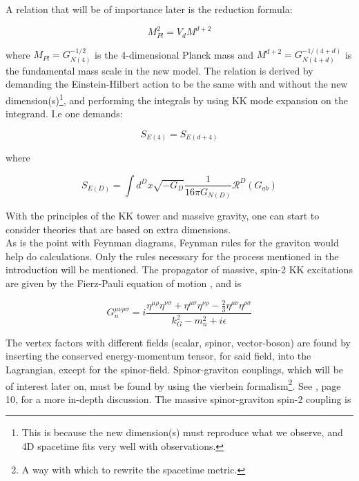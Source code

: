 \documentclass[11pt,a4paper]{article}
\begin{document}
A relation that will be of importance later is the reduction formula:

\begin{equation}
	M_{Pl}^2 = V_dM^{d+2}
	\label{eq:red_form}
\end{equation}

where $M_{Pl} = G_{N(4)}^{-1/2}$ is the 4-dimensional Planck mass and $M^{d+2} = G_{N(4+d)}^{-1/(4+d)}$ is the fundamental mass scale in the new model. The relation is derived by demanding the Einstein-Hilbert action to be the same with and without the new dimension(s)\footnote{This is because the new dimension(s) must reproduce what we observe, and 4D spacetime fits very well with observations.}, and performing the integrals by using KK mode expansion on the integrand. I.e one demands:

\begin{equation}
	S_{E(4)} = S_{E(d+4)}
	\label{eq:requirement_for_reduction}
\end{equation}

where

\begin{equation}
	S_{E(D)} = \int d^D x\sqrt{-G_D} \frac{1}{16\pi G_{N(D)}}\mathcal{R}^{D}(G_{ab})
\end{equation}

With the principles of the KK tower and massive gravity, one can start to consider theories that are based on extra dimensions.\\
As is the point with Feynman diagrams, Feynman rules for the graviton would help do calculations. Only the rules necessary for the process mentioned in the introduction will be mentioned. The propagator of massive, spin-2 KK excitations are given by the Fierz-Pauli equation of motion \cite{HLZ}, and is

\begin{equation}
	G_n^{\mu\nu\rho\sigma} = i\frac{\eta^{\mu\rho}\eta^{\nu\sigma} + \eta^{\mu\sigma}\eta^{\nu\rho} - \frac{2}{3}\eta^{\mu\nu}\eta^{\rho\sigma}}{k_G^2 - m_n^2 + i\epsilon}
	\label{eq:Gprop}
\end{equation}

The vertex factors with different fields (scalar, spinor, vector-boson) are found by inserting the conserved energy-momentum tensor, for said field, into the Lagrangian, except for the spinor-field. Spinor-graviton couplings, which will be of interest later on, must be found by using the vierbein formalism\footnote{A way with which to rewrite the spacetime metric.}. See \cite{HLZ}, page 10, for a more in-depth discussion. The massive spinor-graviton spin-2 coupling is
\end{document}
